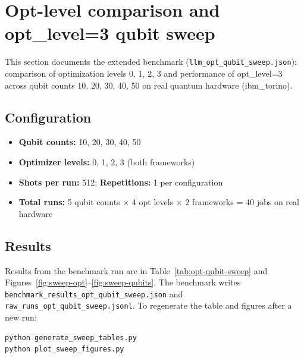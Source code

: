 \documentclass[11pt,a4paper]{article}
\begin{document}
\section{Opt-level comparison and opt\_level=3 qubit sweep}

This section documents the extended benchmark (\texttt{llm\_opt\_qubit\_sweep.json}): comparison of optimization levels 0, 1, 2, 3 and performance of opt\_level=3 across qubit counts 10, 20, 30, 40, 50 on real quantum hardware (ibm\_torino).

\subsection{Configuration}
\begin{itemize}
  \item \textbf{Qubit counts:} 10, 20, 30, 40, 50
  \item \textbf{Optimizer levels:} 0, 1, 2, 3 (both frameworks)
  \item \textbf{Shots per run:} 512; \textbf{Repetitions:} 1 per configuration
  \item \textbf{Total runs:} 5 qubit counts \(\times\) 4 opt levels \(\times\) 2 frameworks = 40 jobs on real hardware
\end{itemize}

\subsection{Results}

Results from the benchmark run are in Table~\ref{tab:opt-qubit-sweep} and Figures~\ref{fig:sweep-opt}--\ref{fig:sweep-qubits}. The benchmark writes \texttt{benchmark\_results\_opt\_qubit\_sweep.json} and \texttt{raw\_runs\_opt\_qubit\_sweep.jsonl}. To regenerate the table and figures after a new run:
\begin{verbatim}
python generate_sweep_tables.py
python plot_sweep_figures.py
\end{verbatim}

\end{document}
